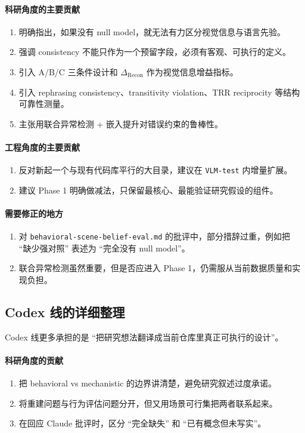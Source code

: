 \documentclass[11pt,a4paper]{ctexart}
\begin{document}
\paragraph{科研角度的主要贡献}
\begin{enumerate}[label=\arabic*.]
  \item 明确指出，如果没有 null model，就无法有力区分视觉信息与语言先验。
  \item 强调 consistency 不能只作为一个预留字段，必须有客观、可执行的定义。
  \item 引入 A/B/C 三条件设计和 $\Delta_{\mathrm{Recon}}$ 作为视觉信息增益指标。
  \item 引入 rephrasing consistency、transitivity violation、TRR reciprocity 等结构可靠性测量。
  \item 主张用联合异常检测 + 嵌入提升对错误约束的鲁棒性。
\end{enumerate}

\paragraph{工程角度的主要贡献}
\begin{enumerate}[label=\arabic*.]
  \item 反对新起一个与现有代码库平行的大目录，建议在 \texttt{VLM-test} 内增量扩展。
  \item 建议 Phase 1 明确做减法，只保留最核心、最能验证研究假设的组件。
\end{enumerate}

\paragraph{需要修正的地方}
\begin{enumerate}[label=\arabic*.]
  \item 对 \texttt{behavioral-scene-belief-eval.md} 的批评中，部分措辞过重，例如把 ``缺少强对照'' 表述为 ``完全没有 null model''。
  \item 联合异常检测虽然重要，但是否应进入 Phase 1，仍需服从当前数据质量和实现负担。
\end{enumerate}

\subsection{Codex 线的详细整理}

Codex 线更多承担的是 ``把研究想法翻译成当前仓库里真正可执行的设计''。

\paragraph{科研角度的贡献}
\begin{enumerate}[label=\arabic*.]
  \item 把 behavioral vs mechanistic 的边界讲清楚，避免研究叙述过度承诺。
  \item 将重建问题与行为评估问题分开，但又用场景可行集把两者联系起来。
  \item 在回应 Claude 批评时，区分 ``完全缺失'' 和 ``已有概念但未写实''。
\end{enumerate}
\end{document}
